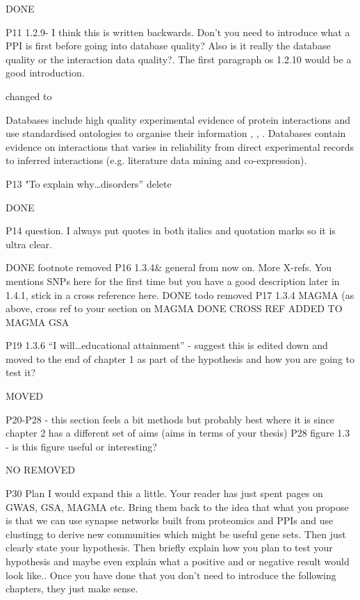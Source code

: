 DONE

P11 1.2.9- I think this is written backwards. Don’t you need to introduce what a PPI is first before going into database quality? Also is it really the database quality or the interaction data quality?. The first paragraph os 1.2.10 would be a good introduction.

changed to

Databases include high quality experimental evidence of protein interactions and use standardised ontologies to organise their information \cite{brazma2006standards}, \cite{hermjakob2004hupo}, \cite{kerrien2007broadening}. Databases contain evidence on interactions that varies in reliability from direct experimental records to inferred interactions (e.g. literature data mining and co-expression).


P13 "To explain why…disorders” delete

DONE

P14 question. I always put quotes in both italics and quotation marks so it is ultra clear.

DONE footnote removed 
P16 1.3.4& general from now on. More X-refs. You mentions SNPs here for the first time but you have a good description later  in 1.4.1, stick in a cross reference here.
DONE
todo removed
P17 1.3.4 MAGMA (as above, cross ref to your section on MAGMA
DONE CROSS REF ADDED TO MAGMA GSA

P19 1.3.6 “I will…educational attainment” - suggest this is edited down and moved to the end of chapter 1 as part of the hypothesis and how you are going to test it?

MOVED

P20-P28 - this section feels a bit methods but probably best where it is since chapter 2 has a different set of aims (aims in terms of your thesis)
P28 figure 1.3 - is this figure useful or interesting?

NO REMOVED

P30 Plan
I would expand this a little. Your reader has just spent pages on GWAS, GSA, MAGMA etc. Bring them back to the idea that what you propose is that we can use synapse networks built from proteomics and PPIs and use clustingg to derive new communities which might be useful gene sets. Then just clearly state your hypothesis. Then briefly explain how you plan to test your hypothesis and maybe even explain what a positive and or negative result would look like.. Once you have done that you don’t need to introduce the following chapters, they just make sense.

